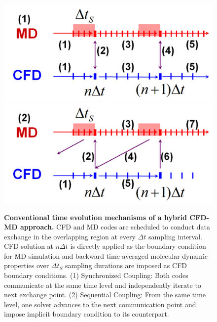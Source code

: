 \documentclass[preprint,12pt]{elsarticle}
\begin{document}
\begin{figure}
\centering
\includegraphics[width=0.8\linewidth]{Synchro_Coupling.pdf}
\includegraphics[width=0.8\linewidth]{Sequential_Coupling.pdf}
\vskip-0.2cm
\caption{\small {\bf Conventional time evolution mechanisms of a hybrid CFD-MD approach.} CFD and MD codes are scheduled to conduct data exchange in the overlapping region at every $\Delta{t}$ sampling interval. CFD solution at $n{\Delta}t$ is directly applied as the boundary condition for MD simulation and backward time-averaged molecular dynamic properties over $\Delta{t_{S}}$ sampling durations are imposed as CFD boundary conditions. (1) Synchronized Coupling: Both codes communicate at the same time level and independently iterate to next exchange point. (2) Sequential Coupling: From the same time level, one solver advances to the next communication point and impose implicit boundary condition to its counterpart.}
\label{Hybrid_Timescale1}
\end{figure}
\end{document}
